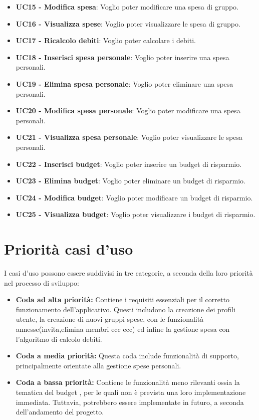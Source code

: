 \begin{itemize}
    \item \textbf{UC15 - Modifica spesa}: Voglio poter modificare una spesa di gruppo.
    \item \textbf{UC16 - Visualizza spese}: Voglio poter visualizzare le spesa di gruppo.
    \item \textbf{UC17 - Ricalcolo debiti}: Voglio poter calcolare i debiti.
    \item \textbf{UC18 - Inserisci spesa personale}: Voglio poter inserire una spesa personali.
    \item \textbf{UC19 - Elimina spesa personale}: Voglio poter eliminare una spesa personali.
    \item \textbf{UC20 - Modifica spesa personale}: Voglio poter modificare una spesa personali.
    \item \textbf{UC21 - Visualizza spesa personale}: Voglio poter visualizzare le spesa personali.
    \item \textbf{UC22 - Inserisci budget}: Voglio poter inserire un budget di risparmio.
    \item \textbf{UC23 - Elimina budget}: Voglio poter eliminare un budget di risparmio.
    \item \textbf{UC24 - Modifica budget}: Voglio poter modificare un budget di risparmio.
    \item \textbf{UC25 - Visualizza budget}: Voglio poter visualizzare i budget di risparmio.
\end{itemize}

\section{Priorità casi d'uso}
    I casi d'uso possono essere suddivisi in tre categorie, a seconda della loro priorità nel processo di sviluppo:
    \begin{itemize}
        \item \textbf{Coda ad alta priorità:} 
        Contiene i requisiti essenziali per il corretto funzionamento dell'applicativo. Questi includono la creazione dei profili utente, la creazione di nuovi gruppi spese, con le funzionalità annesse(invita,elimina membri ecc ecc) ed infine la gestione spesa con l'algoritmo di calcolo debiti.
    
        \item \textbf{Coda a media priorità:} 
        Questa coda include funzionalità di supporto, principalmente orientate alla gestione spese personali.
    
        \item \textbf{Coda a bassa priorità:} 
        Contiene le funzionalità meno rilevanti ossia la tematica del budget , per le quali non è prevista una loro implementazione immediata. Tuttavia, potrebbero essere implementate in futuro, a seconda dell'andamento del progetto.
    \end{itemize}


